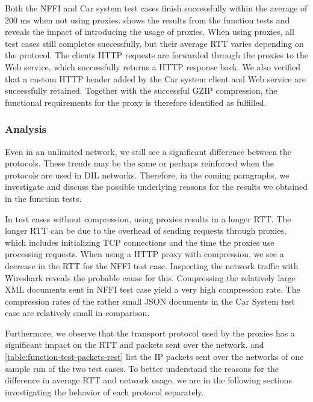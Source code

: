 Both the NFFI and Car system test cases finish successfully within the average
of 200 ms when not using proxies.  shows
the results from the function tests and reveals the impact of introducing the
usage of proxies. When using proxies, all test cases still completes
successfully, but their average RTT varies depending on the protocol. The
clients HTTP requests are forwarded through the proxies to the Web service,
which successfully returns a HTTP response back. We also verified that a custom
HTTP header added by the Car system client and Web service are successfully
retained. Together with the successful GZIP compression, the functional
requirements for the proxy is therefore identified as fulfilled.

\subsubsection{Analysis}

Even in an unlimited network, we still see a significant difference between the
protocols. These trends may be the same or perhaps reinforced when the protocols
are used in DIL networks. Therefore, in the coming paragraphs, we investigate
and discuss the possible underlying reasons for the results we obtained in the
function tests.

In test cases without compression, using proxies results in a longer RTT. The
longer RTT can be due to the overhead of sending requests through proxies, which
includes initializing TCP connections and the time the proxies use processing
requests. When using a HTTP proxy with compression, we see a decrease in the RTT
for the NFFI test case. Inspecting the network traffic with Wireshark reveals
the probable cause for this. Compressing the relatively large XML documents sent
in NFFI test case yield a very high compression rate. The compression rates of
the rather small JSON documents in the Car System test case are relatively small
in comparison.

Furthermore, we observe that the transport protocol used by the proxies has a
significant impact on the RTT and packets sent over the network.
 and
\cref{table:function-test-packets-rest} list the IP packets sent over the
networks of one sample run of the two test cases. To better understand the
reasons for the difference in average RTT and network usage, we are in the
following sections investigating the behavior of each protocol separately.

